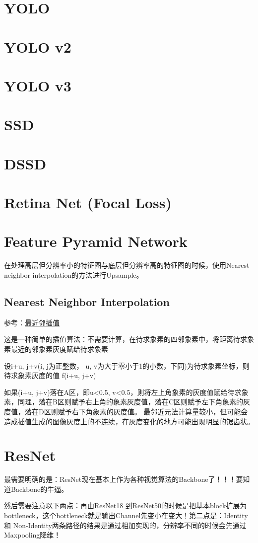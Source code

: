 \section{YOLO}


\section{YOLO v2}


\section{YOLO v3}


\section{SSD}


\section{DSSD}


\section{Retina Net (Focal Loss)}

\section{Feature Pyramid Network}

在处理高层但分辨率小的特征图与底层但分辨率高的特征图的时候，使用Nearest neighbor interpolation的方法进行Upsample。

\subsection{Nearest Neighbor Interpolation}

参考：\href{https://blog.csdn.net/linqianbi/article/details/78593724}{最近邻插值}

这是一种简单的插值算法：不需要计算，在待求象素的四邻象素中，将距离待求象素最近的邻象素灰度赋给待求象素

设i+u, j+v(i, j为正整数， u, v为大于零小于1的小数，下同)为待求象素坐标，则待求象素灰度的值 f(i+u, j+v)

如果(i+u, j+v)落在A区，即u<0.5, v<0.5，则将左上角象素的灰度值赋给待求象素，同理，落在B区则赋予右上角的象素灰度值，落在C区则赋予左下角象素的灰度值，落在D区则赋予右下角象素的灰度值。
最邻近元法计算量较小，但可能会造成插值生成的图像灰度上的不连续，在灰度变化的地方可能出现明显的锯齿状。

\section{ResNet}

最需要明确的是：ResNet现在基本上作为各种视觉算法的Backbone了！！！要知道Backbone的牛逼。

然后需要注意以下两点：再由ResNet18 到ResNet50的时候是把基本block扩展为bottleneck，这个bottleneck就是输出Channel先变小在变大！第二点是：Identity 和 Non-Identity两条路径的结果是通过相加实现的，分辨率不同的时候会先通过Maxpooling降维！






